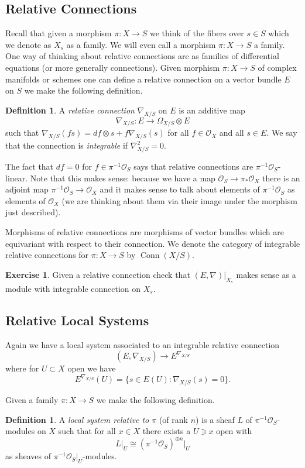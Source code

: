 \documentclass[12pt]{book}
\numberwithin{equation}{section}
\theoremstyle{definition}
\newtheorem{definition}[theorem]{Definition}
\newtheorem{exercise}[theorem]{Exercise}
\theoremstyle{remark}
\newcommand{\Ocal}{\mathcal{O}}
\newcommand{\Conn}{\operatorname{Conn}}
\begin{document}
\subsection{Relative Connections}
Recall that given a morphism $\pi:X \to S$ we think of the fibers over $s\in S$ which we denote as $X_s$ as a family. 
We will even call a morphism $\pi:X\to S$ a family. 
One way of thinking about relative connections are as families of differential equations (or more generally connections). 
Given morphism $\pi: X\to S$ of complex manifolds or schemes one can define a relative connection on a vector bundle $E$ on $S$ we make the following definition.
\begin{definition}
A \emph{relative connection} $\nabla_{X/S}$ on $E$ is an additive map 
 $$ \nabla_{X/S}: E \to \Omega_{X/S} \otimes E $$
such that $\nabla_{X/S}(f s) = df \otimes s + f \nabla_{X/S}(s)$ for all $f \in \Ocal_X$ and all $s \in E$. 
We say that the connection is \emph{integrable} if $\nabla_{X/S}^2=0$. 
\end{definition}
The fact that $df=0$ for $f \in \pi^{-1}\Ocal_S$ says that relative connections are $\pi^{-1}\Ocal_S$-linear.
Note that this makes sense: because we have a map $\Ocal_S \to \pi_* \Ocal_X$ there is an adjoint map $\pi^{-1}\Ocal_S \to \Ocal_X$ and it makes sense to talk about elements of $\pi^{-1}\Ocal_S$ as elements of $\Ocal_X$ (we are thinking about them via their image under the morphism just described). 

Morphisms of relative connections are morphisms of vector bundles which are equivariant with respect to their connection. 
We denote the category of integrable relative connections for $\pi:X\to S$ by $\Conn(X/S)$.

\begin{exercise}
	Given a relative connection check that $(E,\nabla)\vert_{X_s}$ makes sense as a module with integrable connection on $X_s$.
\end{exercise}

\subsection{Relative Local Systems}
Again we have a local system associated to an integrable relative connection
$$ (E,\nabla_{X/S}) \to E^{\nabla_{X/S}} $$
where for $U \subset X$ open we have 
 $$ E^{\nabla_{X/S}}(U) = \lbrace s \in E(U) \colon \nabla_{X/S}(s) =0 \rbrace.$$

Given a family $\pi:X\to S$ we make the following definition. 
\begin{definition}
	A \emph{local system relative to $\pi$} (of rank $n$) is a sheaf $L$ of $\pi^{-1}\Ocal_S$-modules on $X$ such that for all $x\in X$ there exists a $U\owns x$ open with 
	 $$ L \vert_U \cong (\pi^{-1}\Ocal_S)^{\oplus n}\vert_U $$
	 as sheaves of $\pi^{-1}\Ocal_S\vert_U$-modules. 
\end{definition}
\end{document}

